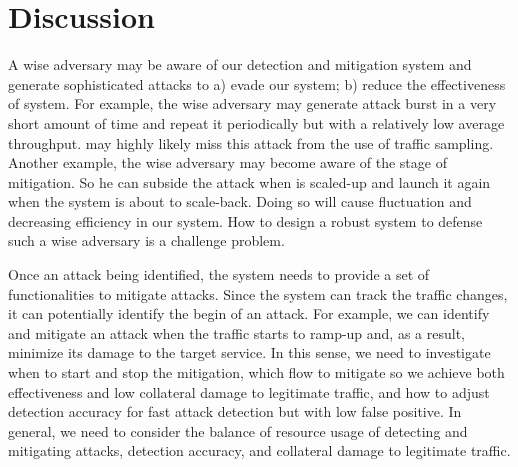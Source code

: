 \section{Discussion}

A wise adversary may be aware of our detection and mitigation system and generate sophisticated attacks to a) evade our \nimbus system; b) reduce the effectiveness of \nimbus system.
%
For example, the wise adversary may generate attack burst in a very short amount of time and repeat it periodically but with a relatively low average throughput. 
%
\nimbus may highly likely miss this attack from the use of traffic sampling. 
%
Another example, the wise adversary may become aware of the stage of mitigation. So he can subside the attack when \nimbus is scaled-up and launch it again when the system is about to scale-back. Doing so will cause fluctuation and decreasing efficiency in our system.
%
How to design a robust system to defense such a wise adversary is a challenge problem.

Once an attack being identified, the system needs to provide a set of functionalities to mitigate attacks.
%
Since the system can track the traffic changes, it can potentially identify the begin of an attack. 
%
For example, we can identify and mitigate an attack when the traffic starts to ramp-up and, as a result, minimize its damage to the target service. 
%
In this sense, we need to investigate when to start and stop the mitigation, which flow to mitigate so we achieve both effectiveness and low collateral damage to legitimate traffic, 
and how to adjust detection accuracy for fast attack detection but with low false positive. 
%
In general, we need to consider the balance of resource usage of detecting and mitigating attacks, detection accuracy, and collateral damage to legitimate traffic.

